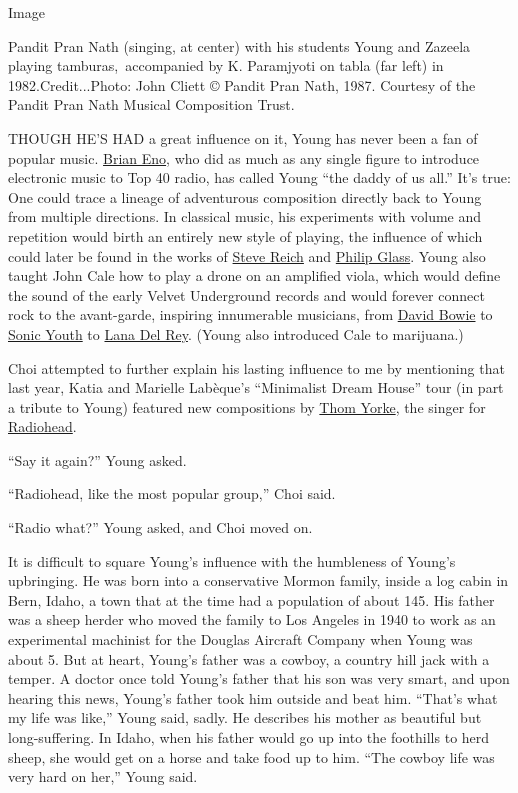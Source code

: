 Image

Pandit Pran Nath (singing, at center) with his students Young and
Zazeela playing tamburas,~accompanied by K. Paramjyoti on tabla (far
left) in 1982.Credit...Photo: John Cliett © Pandit Pran Nath, 1987.
Courtesy of the Pandit Pran Nath Musical Composition Trust.

THOUGH HE'S HAD a great influence on it, Young has never been a fan of
popular music.
\href{https://www.nytimes.com/2020/04/29/arts/music/brian-eno-ambient-songs.html}{Brian
Eno}, who did as much as any single figure to introduce electronic music
to Top 40 radio, has called Young ``the daddy of us all.'' It's true:
One could trace a lineage of adventurous composition directly back to
Young from multiple directions. In classical music, his experiments with
volume and repetition would birth an entirely new style of playing, the
influence of which could later be found in the works of
\href{https://www.nytimes.com/2016/10/02/arts/music/steve-reich-at-80-still-plugged-in-still-plugging-away.html}{Steve
Reich} and
\href{https://www.nytimes.com/topic/person/philip-glass}{Philip Glass}.
Young also taught John Cale how to play a drone on an amplified viola,
which would define the sound of the early Velvet Underground records and
would forever connect rock to the avant-garde, inspiring innumerable
musicians, from
\href{https://www.nytimes.com/topic/person/david-bowie}{David Bowie} to
\href{https://www.nytimes.com/2019/09/14/style/kim-gordons-other-life.html}{Sonic
Youth} to
\href{https://www.nytimes.com/2019/08/28/arts/music/lana-del-rey-norman-rockwell-album.html}{Lana
Del Rey}. (Young also introduced Cale to marijuana.)

Choi attempted to further explain his lasting influence to me by
mentioning that last year, Katia and Marielle Labèque's ``Minimalist
Dream House'' tour (in part a tribute to Young) featured new
compositions by
\href{https://www.nytimes.com/interactive/2019/10/28/magazine/thom-yorke-radiohead-interview.html}{Thom
Yorke}, the singer for
\href{https://www.nytimes.com/topic/organization/radiohead}{Radiohead}.

``Say it again?'' Young asked.

``Radiohead, like the most popular group,'' Choi said.

``Radio what?'' Young asked, and Choi moved on.

It is difficult to square Young's influence with the humbleness of
Young's upbringing. He was born into a conservative Mormon family,
inside a log cabin in Bern, Idaho, a town that at the time had a
population of about 145. His father was a sheep herder who moved the
family to Los Angeles in 1940 to work as an experimental machinist for
the Douglas Aircraft Company when Young was about 5. But at heart,
Young's father was a cowboy, a country hill jack with a temper. A doctor
once told Young's father that his son was very smart, and upon hearing
this news, Young's father took him outside and beat him. ``That's what
my life was like,'' Young said, sadly. He describes his mother as
beautiful but long-suffering. In Idaho, when his father would go up into
the foothills to herd sheep, she would get on a horse and take food up
to him. ``The cowboy life was very hard on her,'' Young said.

